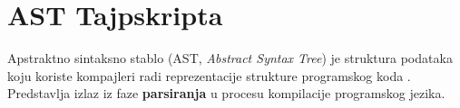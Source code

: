 \chapter{AST Tajpskripta}

Apstraktno sintaksno stablo (AST, \textsl{Abstract Syntax Tree}) je struktura podataka koju koriste kompajleri radi reprezentacije strukture programskog koda \cite{wiki:ast}.
Predstavlja izlaz iz faze \textbf{parsiranja} u procesu kompilacije programskog jezika.




